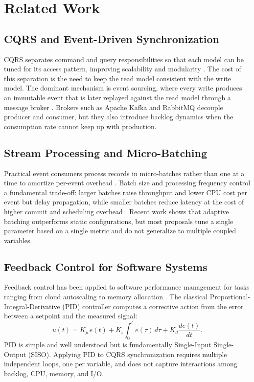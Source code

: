 \section{Related Work}

\subsection{CQRS and Event-Driven Synchronization}

CQRS separates command and query responsibilities so that each model can be tuned for its access pattern, improving scalability and modularity \cite{fowler2011,zhanglong2017}. The cost of this separation is the need to keep the read model consistent with the write model. The dominant mechanism is event sourcing, where every write produces an immutable event that is later replayed against the read model through a message broker \cite{kleppmann2017,munonye2023}. Brokers such as Apache Kafka and RabbitMQ decouple producer and consumer, but they also introduce backlog dynamics when the consumption rate cannot keep up with production.

\subsection{Stream Processing and Micro-Batching}

Practical event consumers process records in micro-batches rather than one at a time to amortize per-event overhead \cite{das2018}. Batch size and processing frequency control a fundamental trade-off: larger batches raise throughput and lower CPU cost per event but delay propagation, while smaller batches reduce latency at the cost of higher commit and scheduling overhead \cite{wu2019,wu2020}. Recent work shows that adaptive batching outperforms static configurations, but most proposals tune a single parameter based on a single metric and do not generalize to multiple coupled variables.

\subsection{Feedback Control for Software Systems}

Feedback control has been applied to software performance management for tasks ranging from cloud autoscaling to memory allocation \cite{hellerstein2004}. The classical Proportional-Integral-Derivative (PID) controller computes a corrective action from the error between a setpoint and the measured signal:
\begin{equation}
u(t) = K_p\,e(t) + K_i \int_0^t e(\tau)\,d\tau + K_d \frac{de(t)}{dt}.
\label{eq:pid}
\end{equation}
PID is simple and well understood but is fundamentally Single-Input Single-Output (SISO). Applying PID to CQRS synchronization requires multiple independent loops, one per variable, and does not capture interactions among backlog, CPU, memory, and I/O.

